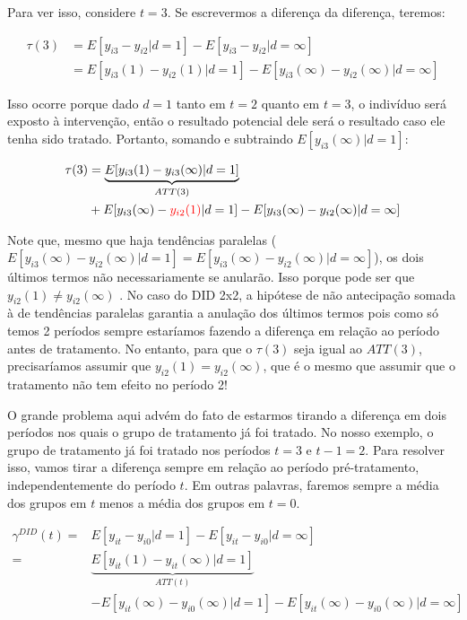\documentclass[portugues]{article}
\begin{document}
Para ver isso, considere $t = 3$. Se escrevermos a diferença da diferença, teremos:

\[
\begin{split}
    \tau(3) &= E[y_{i3} - y_{i2}|d=1] - E[y_{i3} - y_{i2}|d=\infty] \\
         &= E[y_{i3}(1) - y_{i2}(1)|d=1] - E[y_{i3}(\infty) - y_{i2}(\infty)|d=\infty]
\end{split}
\]

Isso ocorre porque dado $d=1$ tanto em $t=2$ quanto em $t=3$, o indivíduo será exposto à intervenção, então o resultado potencial dele será o resultado caso ele tenha sido tratado. Portanto, somando e subtraindo $E[y_{i3}(\infty)|d=1]$:

\[
\begin{split}
   \tau(3) &=  \underbrace{E[y_{i3}(1) - y_{i3}(\infty)|d=1]}_{ATT(3)} \\
           &\vspace{1mm}+  E[y_{i3}(\infty) - \textcolor{red}{y_{i2}(1)}|d=1] - E[y_{i3}(\infty) - y_{i2}(\infty)|d=\infty]
\end{split}
\]

Note que, mesmo que haja tendências paralelas ($E[y_{i3}(\infty) - y_{i2}(\infty)|d=1] = E[y_{i3}(\infty) - y_{i2}(\infty)|d=\infty]$), os dois últimos termos não necessariamente se anularão. Isso porque pode ser que $y_{i2}(1) \neq  y_{i2}(\infty)$ . No caso do DID 2x2, a hipótese de não antecipação somada à de tendências paralelas garantia a anulação dos últimos termos pois como só temos 2 períodos sempre estaríamos fazendo a diferença em relação ao período antes de tratamento. No entanto, para que o $\tau(3)$ seja igual ao $ATT(3)$, precisaríamos assumir que $y_{i2}(1) =  y_{i2}(\infty)$, que é o mesmo que assumir que o tratamento não tem efeito no período 2!

O grande problema aqui advém do fato de estarmos tirando a diferença em dois períodos nos quais o grupo de tratamento já foi tratado. No nosso exemplo, o grupo de tratamento já foi tratado nos períodos $t=3$ e $t-1=2$. Para resolver isso, vamos tirar a diferença sempre em relação ao período pré-tratamento, independentemente do período $t$. Em outras palavras, faremos sempre a média dos grupos em $t$ menos a média dos grupos em $t=0$.

\[
\begin{split}
   \gamma^{DID}(t) =& E[y_{it} - y_{i0}|d=1] - E[y_{it} - y_{i0}|d=\infty] \\
                    =&\underbrace{E[y_{it}(1) - y_{it}(\infty)|d=1]}_{ATT(t)} \\
                    &-  E[y_{it}(\infty) - y_{i0}(\infty)|d=1] - E[y_{it}(\infty) - y_{i0}(\infty)|d=\infty]
\end{split}
\]
\end{document}
